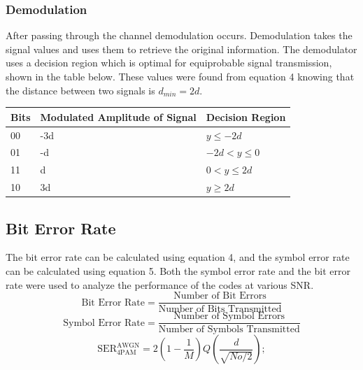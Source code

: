 \documentclass{article}
\begin{document}
\subsubsection{Demodulation}
After passing through the channel demodulation occurs. Demodulation takes the signal values and uses them to retrieve the original information. The demodulator uses a decision region which is optimal for equiprobable signal transmission, shown in the table below. These values were found from equation 4 knowing that the distance between two signals is $d_{min} = 2d$.
\begin{center}
\begin{tabular}{|l|l|l|} \hline
Bits & Modulated Amplitude of Signal          & Decision Region \\ \hline
00   & -3d     & $y \leq -2d$	  \\ \hline
01   & -d     & $-2d < y \leq 0$    \\ \hline
11   & d     & $0 < y \leq 2d$     \\ \hline
10   & 3d      & $y \geq 2d$     \\ \hline
\end{tabular}
\end{center}

\subsection{Bit Error Rate}
The bit error rate can be calculated using equation 4, and the symbol error rate can be calculated using equation 5. Both the symbol error rate and the bit error rate were used to analyze the performance of the codes at various SNR.
\begin{equation}
    \text{Bit Error Rate} = \frac{\text{Number of Bit Errors}}{\text{Number of Bits Transmitted}}
\end{equation}
\begin{equation}
    \text{Symbol Error Rate} = \frac{\text{Number of Symbol Errors}}{\text{Number of Symbols Transmitted}}
\end{equation}
\begin{equation}
    \text{SER}_{\text{4PAM}}^{\text{AWGN}} = 2(1-\frac{1}{M})Q(\frac{d}{\sqrt{No/2}});
\end{equation}
\end{document}
